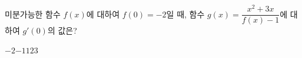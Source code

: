 미분가능한 함수 $f(x)$에 대하여 $f(0)=-2$일 때, 함수 $g(x)=\dfrac{x^2+3x}{f(x)-1}$에 대하여 $g'(0)$의 값은?
\begin{choices32}{$-2$}{$-1$}{$1$}{$2$}{$3$}\end{choices32}
